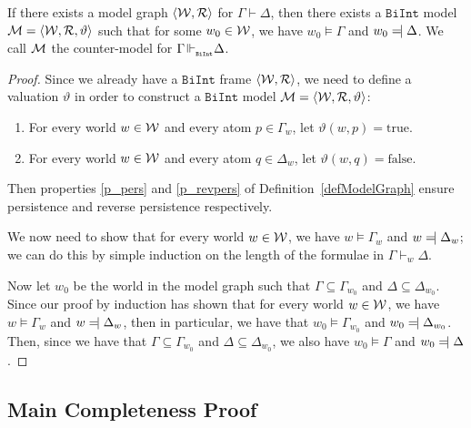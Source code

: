 \documentclass{llncs}
\numberwithin{equation}{section}
\newcommand{\pair}[2]{\langle #1, #2\rangle}
\newcommand{\Lg}[1]{\mathtt{#1}}
\newcommand{\sequent}{\vdash}
\newcommand{\Force}{\vDash}
\def\Reject{=\joinrel\mathrel|}
\newcommand{\mycal}[1]{
        {\cal{#1}}
}
\newcommand{\Model}{
        \mycal{M}=\langle \mycal{W}, \mycal{R}, \vartheta \rangle
}
\newcommand {\BiInt}{
        \Lg{BiInt}
}
\newcommand{\true}{\mbox{true}}
\newcommand{\false}{\mbox{false}}
\newcommand{\entails}{\hspace{-0.05cm}\Vdash_{_{\BiInt}}\hspace{-0.1cm}}
\begin{document}
\begin{lemma}\label{modelGraphToModel}
If there exists a model graph $\pair{\mycal{W}}{\mycal{R}}$ for $\Gamma \sequent \Delta$, then there exists a $\BiInt$ model $\Model$ such that for some $w_0 \in \mycal{W}$, we have $w_0 \Force \Gamma$ and $w_0 \Reject \Delta$. We call $\mycal{M}$ the counter-model for $\Gamma \entails \Delta$.
\end{lemma}
\begin{proof}
Since we already have a $\BiInt$ frame $\pair{\mycal{W}}{\mycal{R}}$, we need to define a valuation $\vartheta$ in order to construct a $\BiInt$ model $\Model$:
\begin{enumerate}
	\item For every world $w \in \mycal{W}$ and every atom $p \in \Gamma_w$, let $\vartheta(w,p) = \true$.
	\item For every world $w \in \mycal{W}$ and every atom $q \in \Delta_w$, let $\vartheta(w,q) = \false$. 
\end{enumerate}

Then properties \ref{p_pers} and \ref{p_revpers} of Definition~\ref{defModelGraph} ensure persistence and reverse persistence respectively.

We now need to show that for every world $w \in \mycal{W}$, we have $w \Force \Gamma_w$ and $w \Reject \Delta_w$; we can do this by simple induction on  the length of the formulae in $\Gamma \sequent_w \Delta$.

Now let $w_0$ be the world in the model graph such that $\Gamma \subseteq \Gamma_{w_0}$ and $\Delta \subseteq \Delta_{w_0}$. Since our proof by induction has shown that for every world $w \in \mycal{W}$, we have $w \Force \Gamma_w$ and $w \Reject \Delta_w$, then in particular, we have that $w_0 \Force \Gamma_{w_0}$ and $w_0 \Reject \Delta_{w_0}$. Then, since we have that $\Gamma \subseteq \Gamma_{w_0}$ and $\Delta \subseteq \Delta_{w_0}$, we also have $w_0 \Force \Gamma$ and $w_0 \Reject \Delta$.
\end{proof}

\subsection{Main Completeness Proof}
\end{document}
